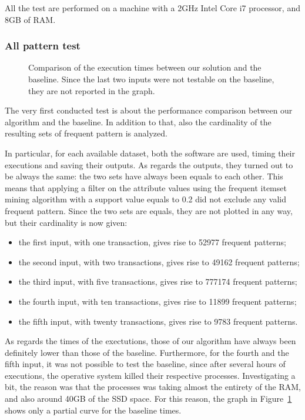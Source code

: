 \documentclass{acm_proc_article-sp-sigmod09}
\begin{document}
All the test are performed on a machine with a 2GHz Intel Core i7 processor, and 8GB of RAM.

\subsubsection{All pattern test}

\begin{figure}
\centering
{}
\caption{Comparison of the execution times between our solution and the baseline. Since the last two inputs were not testable on the baseline, they are not reported in the graph.}
\label{fig:testone}
\end{figure}

The very first conducted test is about the performance comparison between our algorithm and the baseline. In addition to that, also the cardinality of the resulting sets of frequent pattern is analyzed.

In particular, for each available dataset, both the software are used, timing their executions and saving their outputs. As regards the outputs, they turned out to be always the same: the two sets have always been equals to each other. This means that applying a filter on the attribute values using the frequent itemset mining algorithm with a support value equals to 0.2 did not exclude any valid frequent pattern. Since the two sets are equals, they are not plotted in any way, but their cardinality is now given:
\begin{itemize}
\item the first input, with one transaction, gives rise to 52977 frequent patterns;
\item the second input, with two transactions, gives rise to 49162 frequent patterns;
\item the third input, with five transactions, gives rise to 777174 frequent patterns;
\item the fourth input, with ten transactions, gives rise to 11899 frequent patterns;
\item the fifth input, with twenty transactions, gives rise to 9783 frequent patterns.
\end{itemize}

As regards the times of the exectutions, those of our algorithm have always been definitely lower than those of the baseline. Furthermore, for the fourth and the fifth input, it was not possible to test the baseline, since after several hours of executions, the operative system killed their respective processes. Investigating a bit, the reason was that the processes was taking almost the entirety of the RAM, and also around 40GB of the SSD space. For this reason, the graph in Figure~\ref{fig:testone} shows only a partial curve for the baseline times. 
\end{document}

